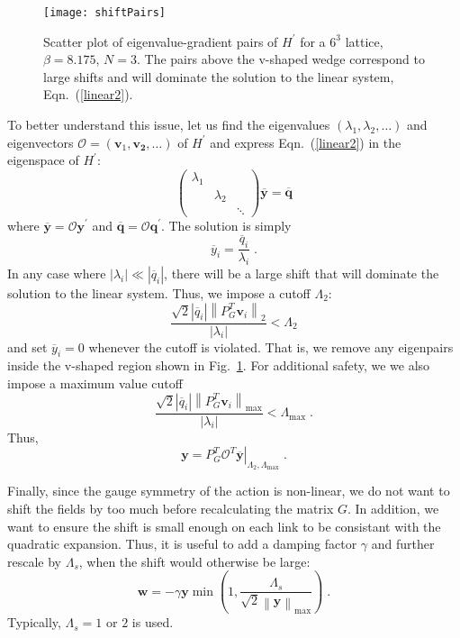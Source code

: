 \documentclass[preprint,aps,prd]{revtex4-2}
\newcommand{\be}{\begin{equation}}
\newcommand{\eq}{\end{equation}}
\begin{document}
\begin{figure}
\texttt{[image: shiftPairs]}
\caption{Scatter plot of eigenvalue-gradient pairs of $H^\prime$
  for a $6^3$ lattice, $\beta = 8.175$, $N=3$.  The pairs above the
  v-shaped wedge correspond to large shifts and will dominate
  the solution to the linear system, Eqn.~(\ref{linear2}).
  \label{shiftPairs}}
\end{figure}

To better understand this issue, let us find the eigenvalues
$\left(\lambda_1, \lambda_2, \ldots\right)$ and
eigenvectors $\mathcal{O}=\left(\mathbf{v}_1, \mathbf{v_2}, \ldots\right)$
of $H^\prime$ and express Eqn.~(\ref{linear2}) in the eigenspace of $H^\prime$:
\be
\begin{pmatrix}
    \lambda_1 & & \\
    & \lambda_2 & \\
    & & \ddots  \end{pmatrix} \overline{\mathbf{y}} =
  \overline{\mathbf{q}} \label{linear3}
\eq
where $\overline{\mathbf{y}} = \mathcal{O} \mathbf{y}^\prime$ and
$\overline{\mathbf{q}}  = \mathcal{O} \mathbf{q}^\prime$.
The solution is simply
\be
    \overline{y}_i = \frac{\overline{q}_i}{\lambda_i} \; .
\eq
In any case where $\left|\lambda_i\right|\ll
\left|\overline{q}_i\right|$,
there will be a large shift that will dominate the solution
to the linear system.
Thus, we impose a cutoff $\Lambda_2$:
\be
    \frac{\sqrt{2} \left|\overline{q}_i\right|\left\lVert P_G^T \mathbf{v}_i\right\rVert_2}{\left|\lambda_i\right|}
     < \Lambda_2 \label{lambda2}
\eq
%
and set $\overline{y}_i=0$ whenever the cutoff is violated.
That is, we remove any eigenpairs inside the v-shaped
region shown in Fig.~\ref{shiftPairs}.  For additional safety, we
we also impose a maximum value cutoff
\be
    \frac{\sqrt{2} \left|\overline{q}_i\right|
      \left\lVert P_G^T \mathbf{v}_i\right\rVert_\mathrm{max}}
    {\left|\lambda_i\right|}
    < \Lambda_\mathrm{max} \; .
\eq
Thus,
\be
      \mathbf{y} = P_G^T \left. \mathcal{O}^T
                    \overline{\mathbf{y}}\right|_{\Lambda_2,\Lambda_\mathrm{max}} \; .
\eq

Finally, since the gauge symmetry of the action is non-linear,
we do not want to shift the fields by too much before recalculating
the matrix $G$.  In addition, we want to ensure the shift is small
enough on each link to be consistant with the quadratic expansion.
Thus, it is useful to add a damping factor $\gamma$ and
further rescale by $\Lambda_s$, when the shift would
otherwise be large:
\be
  \mathbf{w} = - \gamma \mathbf{y} \min\left(1, \frac{\Lambda_s}{
    \sqrt{2} \left\lVert \mathbf{y}\right\rVert_\mathrm{max}}\right) \; .
\eq
Typically, $\Lambda_s = 1$ or $2$ is used.
\end{document}
